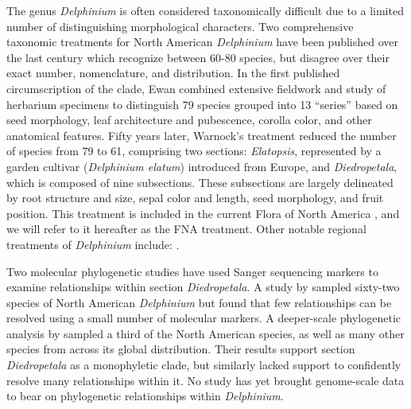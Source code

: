 \documentclass[11pt]{article}
\begin{document}
The genus \emph{Delphinium} is often considered taxonomically difficult due to a 
limited number of 
distinguishing
morphological characters. Two comprehensive 
taxonomic treatments for North American \emph{Delphinium} have been published over 
the last century which recognize between 60-80 species, but disagree over their
exact number, nomenclature, and distribution. 
% 
In the first published circumscription of the clade, Ewan \citep{ewan_synopsis_1945}
combined extensive 
fieldwork and study of herbarium specimens to distinguish 79 species grouped 
into 13 “series” based on seed morphology, leaf architecture and pubescence, 
corolla color, and other anatomical features. 
% 
Fifty years later, Warnock’s treatment \citep{warnock_taxonomic_1995}
reduced the number of species 
from 79 to 61, comprising two sections: \emph{Elatopsis}, represented by a garden 
cultivar (\emph{Delphinium elatum}) introduced from Europe, and 
\emph{Diedropetala}, which is composed of nine subsections.
%
These subsections are largely delineated by root structure and size, 
sepal color and length, seed morphology, and fruit position.
% 
This treatment is included in the current Flora of North America
\citep[FNA;][]{Warnock_1997_FNA_Delphinium}, and we will refer to it hereafter as 
the FNA treatment.
Other notable regional treatments of \emph{Delphinium} include:
\cite{rydberg_delphinium_1899, ewan_genus_1942, wilde1931studies, cronquist_intermountain_1984, ackerfield_flora_2022, chambers_comments_2018, lewis_taxonomic_1954,koontz_delphinium_2012,WeberWittmann2012,holmgren2012intermountain}.

Two molecular phylogenetic studies have used
Sanger sequencing markers to examine relationships within 
section \emph{Diedropetala}.
A study by \citet{koontz_using_2004} sampled sixty-two species of 
North American \emph{Delphinium} but found that few relationships can
be resolved using a small number of molecular markers. 
% 
A deeper-scale phylogenetic analysis by \cite{jabbour_phylogeny_2012} 
sampled a third of the North American species, as well as many other
species from across its global distribution.
Their results support section \emph{Diedropetala} as a monophyletic 
clade, but similarly lacked support to confidently 
resolve many relationships within it.
% 
No study has yet brought genome-scale data to bear on phylogenetic 
relationships within \emph{Delphinium}.
\end{document}
